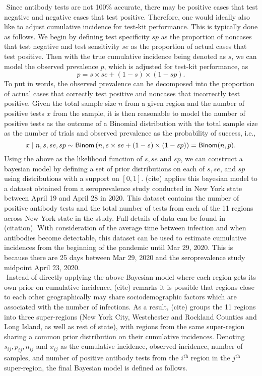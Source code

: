 \newline$ $
Since antibody tests are not 100\% accurate, there may be positive cases that test negative and negative cases that test positive. Therefore, one would ideally also like to adjust cumulative incidence for test-kit performance. This is typically done as follows. We begin by defining test specificity $sp$ as the proportion of noncases that test negative and test sensitivity $se$ as the proportion of actual cases that test positive. Then with the true cumulative incidence being denoted as $s$, we can model the observed prevalence $p$, which is adjusted for test-kit performance, as
\[
p = s \times se + (1-s) \times (1 - sp).
\]
To put in words, the observed prevalence can be decomposed into the proportion of actual cases that correctly test positive and noncases that incorrectly test positive. Given the total sample size $n$ from a given region and the number of positive tests $x$ from the sample, it is then reasonable to model the number of positive tests as the outcome of a Binomial distribution with the total sample size as the number of trials and observed prevalence as the probability of success, i.e.,
\[
x \mid n, s, se, sp \sim {\sf{Binom}}\left(n, s \times se + (1-s) \times (1 - sp)\right) = {\sf{Binom}}(n, p).
\]
Using the above as the likelihood function of $s, se$ and $sp$, we can construct a bayesian model by defining a set of prior distributions on each of $s, se$, and $sp$ using distributions with a support on $[0,1]$. (cite) applies this bayesian model to a dataset obtained from a seroprevalence study conducted in New York state between April 19 and April 28 in 2020. This dataset contains the number of positive antibody tests and the total number of tests from each of the 11 regions across New York state in the study. Full details of data can be found in (citation). With consideration of the average time between infection and when antibodies become detectable, this dataset can be used to estimate cumulative incidences from the beginning of the pandemic until Mar 29, 2020. This is because there are 25 days between Mar 29, 2020 and the seroprevalence study midpoint April 23, 2020.\\
\newline$ $
Instead of directly applying the above Bayesian model where each region gets its own prior on cumulative incidence, (cite) remarks it is possible that regions close to each other geographically may share sociodemographic factors which are associated with the number of infections. As a result, (cite) groups the 11 regions into three super-regions (New York City, Westchester and Rockland Counties and Long Island, as well as rest of state), with regions from the same super-region sharing a common prior distribution on their cumulative incidences. Denoting $s_{ij}, p_{ij}, n_{ij}$ and $x_{ij}$ as the cumulative incidence, observed incidence, number of samples, and number of positive antibody tests from the $i^\text{th}$ region in the $j^\text{th}$ super-region, the final Bayesian model is defined as follows.
